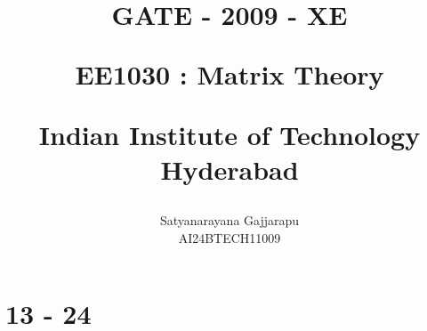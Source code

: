 \documentclass[journal]{IEEEtran}
\begin{document}

\vspace{3cm}




\title{
GATE - 2009 - XE

\large{EE1030 : Matrix Theory}

Indian Institute of Technology Hyderabad
}
\author{Satyanarayana Gajjarapu

AI24BTECH11009
}	





\maketitle




\bigskip

\renewcommand{\thefigure}{\theenumi}
\renewcommand{\thetable}{\theenumi}


\section{13 - 24}
\end{document}
